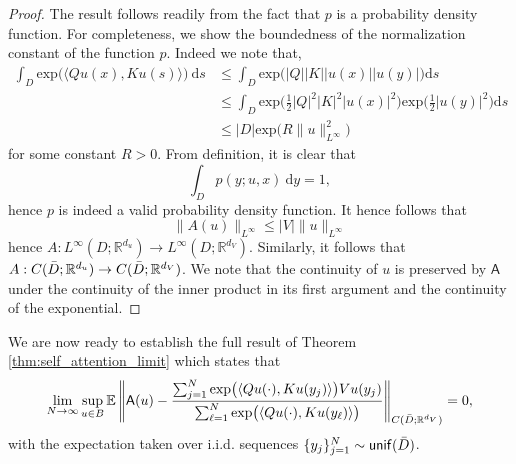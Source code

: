 \documentclass[twoside]{article}
\newcommand{\1}{\mathbbm{1}}
\newcommand{\R}{\mathbbm{R}}
\newcommand{\sA}{\mathsf{A}}
\providecommand{\mathbbm}{\mathbb} %
\newcommand{\E}{\mathbb{E}}
\newcommand{\unif}{\mathsf{unif}}
\begin{document}
\begin{proof}
    The result follows readily from the fact that $p$ is a probability density function. For completeness, we show the boundedness of the normalization constant of the function $p$. Indeed we note that,
    \begin{align*}
    \int_D \mathrm{exp} \big ( \langle Q u(x), K u(s) \rangle \big ) \: \mathrm{d}s &\leq \int_D \mathrm{exp} \big ( |Q| |K| |u(x)| |u(y)| \big ) \mathrm{d}s \\
    &\leq \int_D \mathrm{exp} \bigg ( \frac{1}{2} |Q|^2 |K|^2 |u(x)|^2 \bigg ) \mathrm{exp} \bigg ( \frac{1}{2} |u(y)|^2 \bigg ) \mathrm{d}s \\
    &\leq |D| \mathrm{exp} \big ( R \|u\|_{L^\infty}^2 \big ) 
\end{align*}
for some constant \(R  > 0\). From definition, it is clear that 
\[\int_D p(y; u, x) \: \mathrm{d}y = 1,\] 
hence \(p\) is indeed a valid probability density function. It hence follows that
\[\|A(u)\|_{L^\infty} \leq |V|\|u\|_{L^\infty}\]
hence \(A : L^\infty (D;\R^{d_u}) \to L^\infty (D; \R^{d_V})\). Similarly, it follows that
\(A : C (\Bar{D};\R^{d_u}) \to C (\Bar{D}; \R^{d_V})\). We note that the continuity of $u$ is preserved by $\sA$ under the continuity of the inner product in its first argument and the continuity of the exponential.
\end{proof}
We are now ready to establish the full result of Theorem \ref{thm:self_attention_limit} which states that 
\[ \lim_{N \to \infty} \sup_{u \in B} \E \left \| \sA(u) - \frac{\sum_{j=1}^N \mathrm{exp} \big ( \langle Qu(\cdot), Ku(y_j)  \rangle \big ) V u(y_j)}{\sum_{\ell=1}^N \mathrm{exp} \big ( \langle Qu(\cdot), Ku(y_\ell)  \rangle \big )} \right \|_{C(\Bar{D};\R^{d_V})}  = 0,\]
with the expectation taken over i.i.d. sequences \(\{y_j\}_{j=1}^N \sim \unif(\Bar{D})\).
\end{document}
